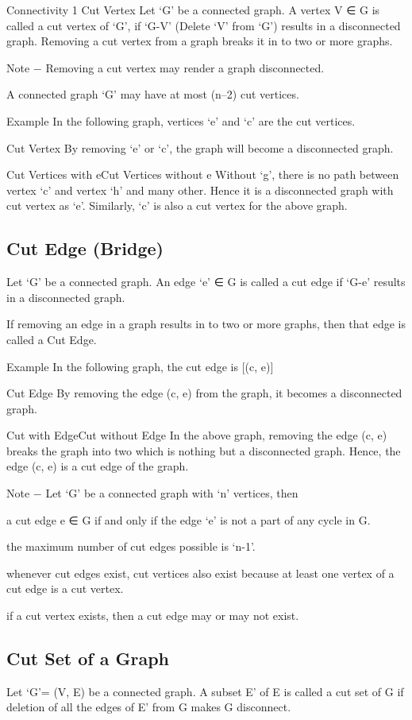 Connectivity 1
Cut Vertex
Let ‘G’ be a connected graph. A vertex V ∈ G is called a cut vertex of ‘G’, if ‘G-V’ (Delete ‘V’ from ‘G’) results in a disconnected graph. Removing a cut vertex from a graph breaks it in to two or more graphs.

Note − Removing a cut vertex may render a graph disconnected.

A connected graph ‘G’ may have at most (n–2) cut vertices.

Example
In the following graph, vertices ‘e’ and ‘c’ are the cut vertices.

Cut Vertex
By removing ‘e’ or ‘c’, the graph will become a disconnected graph.

Cut Vertices with eCut Vertices without e
Without ‘g’, there is no path between vertex ‘c’ and vertex ‘h’ and many other. Hence it is a disconnected graph with cut vertex as ‘e’. Similarly, ‘c’ is also a cut vertex for the above graph.

\subsection{Cut Edge (Bridge)}
Let ‘G’ be a connected graph. An edge ‘e’ ∈ G is called a cut edge if ‘G-e’ results in a disconnected graph.

If removing an edge in a graph results in to two or more graphs, then that edge is called a Cut Edge.

Example
In the following graph, the cut edge is [(c, e)]

Cut Edge
By removing the edge (c, e) from the graph, it becomes a disconnected graph.

Cut with EdgeCut without Edge
In the above graph, removing the edge (c, e) breaks the graph into two which is nothing but a disconnected graph. Hence, the edge (c, e) is a cut edge of the graph.

Note − Let ‘G’ be a connected graph with ‘n’ vertices, then

a cut edge e ∈ G if and only if the edge ‘e’ is not a part of any cycle in G.

the maximum number of cut edges possible is ‘n-1’.

whenever cut edges exist, cut vertices also exist because at least one vertex of a cut edge is a cut vertex.

if a cut vertex exists, then a cut edge may or may not exist.

\subsection{Cut Set of a Graph}
Let ‘G’= (V, E) be a connected graph. A subset E’ of E is called a cut set of G if deletion of all the edges of E’ from G makes G disconnect.

